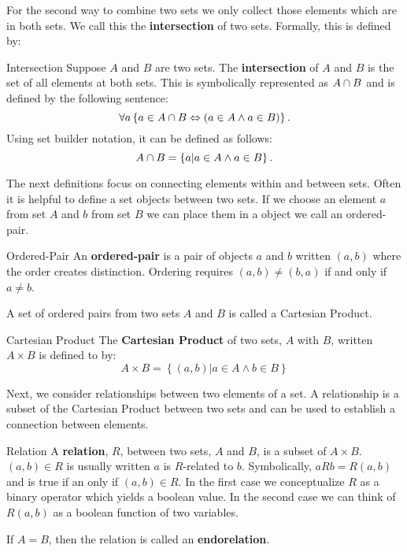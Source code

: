 For the second way to combine two sets we only collect those elements which are in both sets.
We call this the \textbf{intersection} of two sets.
Formally, this is defined by:
\begin{defn}{Intersection}
  Suppose $A$ and $B$ are two sets.
  The \textbf{intersection} of $A$ and $B$ is the set of all elements at both sets.
  This is symbolically represented as $A \cap B$ and is defined by the following sentence:
  $$
  \forall a \left\{ a \in A \cap B \Leftrightarrow (a \in A \wedge a \in B) \right\}.
  $$
  Using set builder notation, it can be defined as follows:
  $$
    A \cap B =  \left\{ a | a \in A \wedge a \in B \right\}.
  $$
\end{defn}


The next definitions focus on connecting elements within and between sets.
Often it is helpful to define a set objects between two sets.
If we choose an element $a$ from set $A$ and $b$ from set $B$ we can place them in a object we call an ordered-pair.
\begin{defn}{Ordered-Pair}
    An \textbf{ordered-pair} is a pair of objects $a$ and $b$ written $(a,b)$ where the order creates distinction.
    Ordering requires $(a,b) \ne (b,a)$ if and only if $a \ne b$.
\end{defn}

A set of ordered pairs from two sets $A$ and $B$ is called a Cartesian Product.
\begin{defn}{Cartesian Product}
    The \textbf{Cartesian Product} of two sets, $A$ with $B$, written $A \times B$ is defined to by:
    $$
        A \times B = \left\{ (a, b) | a \in A \land b \in B \right\}
    $$
\end{defn}

Next, we consider relationships between two elements of a set.
A relationship is a subset of the Cartesian Product between two sets and can be used to establish a connection between elements.

\begin{defn}{Relation}
    A \textbf{relation}, $R$, between two sets, $A$ and $B$, is a subset of $A \times B$.
    $(a, b) \in R$ is usually written $a$ is $R$-related to $b$.
    Symbolically, $aRb = R(a,b)$ and is true if an only if $(a,b) \in R$.
    In the first case we conceptualize $R$ as a binary operator which yields a boolean value.
    In the second case we can think of $R(a,b)$ as a boolean function of two variables.
\end{defn}
If $A = B$, then the relation is called an \textbf{endorelation}.

